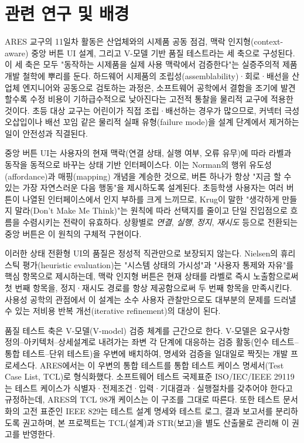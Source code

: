 

\section{관련 연구 및 배경}

ARES 교구의 11일차 활동은 산업체와의 시제품 공동 점검, 맥락 인지형(context-aware) 중앙 버튼 UI 설계, 그리고 V-모델 기반 품질 테스트라는 세 축으로 구성된다. 이 세 축은 모두 "동작하는 시제품을 실제 사용 맥락에서 검증한다"는 실증주의적 제품 개발 철학에 뿌리를 둔다. 하드웨어 시제품의 조립성(assemblability)·회로·배선을 산업체 엔지니어와 공동으로 검토하는 과정은, 소프트웨어 공학에서 결함을 조기에 발견할수록 수정 비용이 기하급수적으로 낮아진다는 고전적 통찰을 물리적 교구에 적용한 것이다. 초등 대상 교구는 어린이가 직접 조립·배선하는 경우가 많으므로, 커넥터 극성 오삽입이나 배선 꼬임 같은 물리적 실패 유형(failure mode)을 설계 단계에서 제거하는 일이 안전성과 직결된다.

중앙 버튼 UI는 사용자의 현재 맥락(연결 상태, 실행 여부, 오류 유무)에 따라 라벨과 동작을 동적으로 바꾸는 상태 기반 인터페이스다. 이는 Norman의 행위 유도성(affordance)과 매핑(mapping) 개념을 계승한 것으로, 버튼 하나가 항상 "지금 할 수 있는 가장 자연스러운 다음 행동"을 제시하도록 설계된다\cite{norman2013design}. 초등학생 사용자는 여러 버튼이 나열된 인터페이스에서 인지 부하를 크게 느끼므로, Krug이 말한 "생각하게 만들지 말라(Don't Make Me Think)"는 원칙에 따라 선택지를 줄이고 단일 진입점으로 흐름을 수렴시키는 전략이 유효하다\cite{krug2014dontmakemethink}. 상황별로 \emph{연결}, \emph{실행}, \emph{정지}, \emph{재시도} 등으로 전환되는 중앙 버튼은 이 원칙의 구체적 구현이다.

이러한 상태 전환형 UI의 품질은 정성적 직관만으로 보장되지 않는다. Nielsen의 휴리스틱 평가(heuristic evaluation)는 "시스템 상태의 가시성"과 "사용자 통제와 자유"를 핵심 항목으로 제시하는데\cite{nielsen1994heuristics}, 맥락 인지형 버튼은 현재 상태를 라벨로 즉시 노출함으로써 첫 번째 항목을, 정지·재시도 경로를 항상 제공함으로써 두 번째 항목을 만족시킨다. 사용성 공학의 관점에서 이 설계는 소수 사용자 관찰만으로도 대부분의 문제를 드러낼 수 있는 저비용 반복 개선(iterative refinement)의 대상이 된다\cite{nielsen1993usability}.

품질 테스트 축은 V-모델(V-model) 검증 체계를 근간으로 한다. V-모델은 요구사항 정의–아키텍처–상세설계로 내려가는 좌변 각 단계에 대응하는 검증 활동(인수 테스트–통합 테스트–단위 테스트)을 우변에 배치하여, 명세와 검증을 일대일로 짝짓는 개발 프로세스다. ARES에서는 이 우변의 통합 테스트를 통합 테스트 케이스 명세서(Test Case List, TCL)로 형식화했다. 소프트웨어 테스트 국제표준 ISO/IEC/IEEE 29119는 테스트 케이스가 식별자·전제조건·입력·기대결과·실행절차를 갖추어야 한다고 규정하는데\cite{iso29119}, ARES의 TCL 98개 케이스는 이 구조를 그대로 따른다. 또한 테스트 문서화의 고전 표준인 IEEE 829는 테스트 설계 명세와 테스트 로그, 결과 보고서를 분리하도록 권고하며\cite{ieee829}, 본 프로젝트는 TCL(설계)과 STR(보고)을 별도 산출물로 관리해 이 권고를 반영한다.

